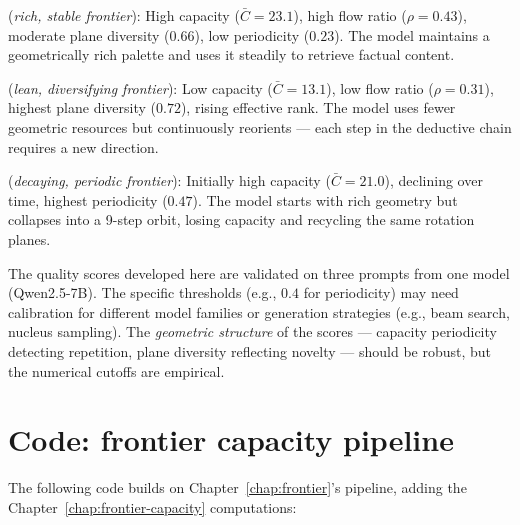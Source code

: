 \documentclass[11pt, twoside, openright]{memoir}
\numberwithin{equation}{chapter}
\begin{document}
\begin{description}[nosep, leftmargin=1.2cm]
\item[Retrieval] (\emph{rich, stable frontier}):
  High capacity ($\bar{C} = 23.1$), high flow ratio ($\rho = 0.43$),
  moderate plane diversity ($0.66$), low periodicity ($0.23$).
  The model maintains a geometrically rich palette and uses it
  steadily to retrieve factual content.

\item[Reasoning] (\emph{lean, diversifying frontier}):
  Low capacity ($\bar{C} = 13.1$), low flow ratio ($\rho = 0.31$),
  highest plane diversity ($0.72$), rising effective rank.
  The model uses fewer geometric resources but continuously
  reorients --- each step in the deductive chain requires a new
  direction.

\item[Adversarial] (\emph{decaying, periodic frontier}):
  Initially high capacity ($\bar{C} = 21.0$), declining over time,
  highest periodicity ($0.47$).  The model starts with rich
  geometry but collapses into a 9-step orbit, losing capacity and
  recycling the same rotation planes.
\end{description}

\begin{pitfall}
The quality scores developed here are validated on three prompts
from one model (Qwen2.5-7B).  The specific thresholds (e.g.,
$0.4$ for periodicity) may need calibration for different model
families or generation strategies (e.g., beam search, nucleus
sampling).  The \emph{geometric structure} of the scores ---
capacity periodicity detecting repetition, plane diversity
reflecting novelty --- should be robust, but the numerical
cutoffs are empirical.
\end{pitfall}


\section{Code: frontier capacity pipeline}
\label{sec:cap-code}

The following code builds on Chapter~\ref{chap:frontier}'s
pipeline, adding the Chapter~\ref{chap:frontier-capacity} computations:
\end{document}
